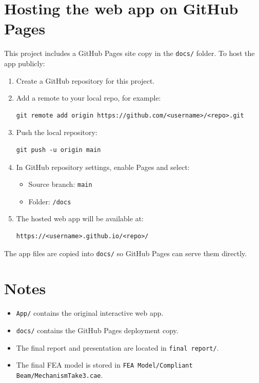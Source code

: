 \documentclass[11pt]{article}
\begin{document}
\section*{Hosting the web app on GitHub Pages}
This project includes a GitHub Pages site copy in the \texttt{docs/} folder. To host the app publicly:
\begin{enumerate}[leftmargin=*, itemsep=0.5em]
  \item Create a GitHub repository for this project.
  \item Add a remote to your local repo, for example:
    \begin{verbatim}
git remote add origin https://github.com/<username>/<repo>.git
    \end{verbatim}
  \item Push the local repository:
    \begin{verbatim}
git push -u origin main
    \end{verbatim}
  \item In GitHub repository settings, enable Pages and select:
    \begin{itemize}[leftmargin=*, itemsep=0.5em]
      \item Source branch: \texttt{main}
      \item Folder: \texttt{/docs}
    \end{itemize}
  \item The hosted web app will be available at:
    \begin{verbatim}
https://<username>.github.io/<repo>/
    \end{verbatim}
\end{enumerate}

The app files are copied into \texttt{docs/} so GitHub Pages can serve them directly.

\section*{Notes}
\begin{itemize}[leftmargin=*, itemsep=0.5em]
  \item \texttt{App/} contains the original interactive web app.
  \item \texttt{docs/} contains the GitHub Pages deployment copy.
  \item The final report and presentation are located in \texttt{final report/}.
  \item The final FEA model is stored in \texttt{FEA Model/Compliant Beam/MechanismTake3.cae}.
\end{itemize}
\end{document}
